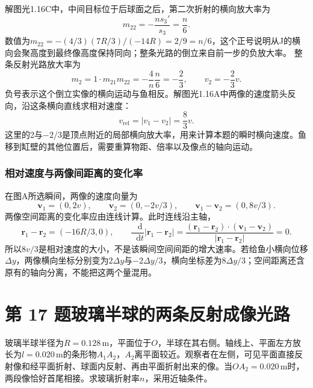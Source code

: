 \documentclass[UTF8,fontset=fandol,a4paper,11pt]{ctexart}
\newcommand{\dd}{\mathop{}\!\mathrm{d}}
\begin{document}
解图光1.16C中，中间目标位于后球面之后，第二次折射的横向放大率为
\[
m_{22}=-\frac{n s_3'}{s_3}=\frac n6.
\]
数值为$m_{22}=-(4/3)(7R/3)/(-14R)=2/9=n/6$，这个正号说明从J的横向会聚高度到最终像高度保持同向；整条光路的倒立来自前一步的负放大率。
整条反射光路放大率为
\[
m_2=1\cdot m_{21}m_{22}
=-\frac4n\frac n6=-\frac23,
\qquad
\boxed{v_2=-\frac23v}.
\]
负号表示这个倒立实像的横向运动与鱼相反。解图光1.16A中两像的速度箭头反向，沿这条横向直线求相对速度：
\[
\boxed{v_{\mathrm{rel}}=|v_1-v_2|
=\frac83v}.
\]
这里的2与$-2/3$是顶点附近的局部横向放大率，用来计算本题的瞬时横向速度。鱼移到缸壁的其他位置后，需要重算物距、倍率以及像点的轴向运动。
\subsubsection*{相对速度与两像间距离的变化率}
在图A所选瞬间，两像的速度向量为
\[
\boldsymbol v_1=(0,2v),\qquad
\boldsymbol v_2=(0,-2v/3),\qquad
\boldsymbol v_1-\boldsymbol v_2=(0,8v/3).
\]
两像空间距离的变化率应由连线计算。此时连线沿主轴，
\[
\boldsymbol r_1-\boldsymbol r_2=(-16R/3,0),\qquad
\frac{\dd}{\dd t}|\boldsymbol r_1-\boldsymbol r_2|
=\frac{(\boldsymbol r_1-\boldsymbol r_2)\cdot
(\boldsymbol v_1-\boldsymbol v_2)}
{|\boldsymbol r_1-\boldsymbol r_2|}=0.
\]
所以$8v/3$是相对速度的大小，不是该瞬间空间间距的增大速率。若给鱼小横向位移$\Delta y$，两像横向坐标分别变为$2\Delta y$与$-2\Delta y/3$，横向坐标差为$8\Delta y/3$；空间距离还含原有的轴向分离，不能把这两个量混用。



\section*{第 17 题\quad 玻璃半球的两条反射成像光路}\label{q:17}

玻璃半球半径为$R=0.128\,\mathrm m$，平面位于$O$，半球在其右侧。轴线上、平面左方放长为$l=0.020\,\mathrm m$的条形物$A_1A_2$，$A_2$离平面较近。观察者在左侧，可见平面直接反射像和经平面折射、球面内反射、再由平面折射出来的像。当$OA_2=0.020\,\mathrm m$时，两段像恰好首尾相接。求玻璃折射率$n$，采用近轴条件。
\end{document}
